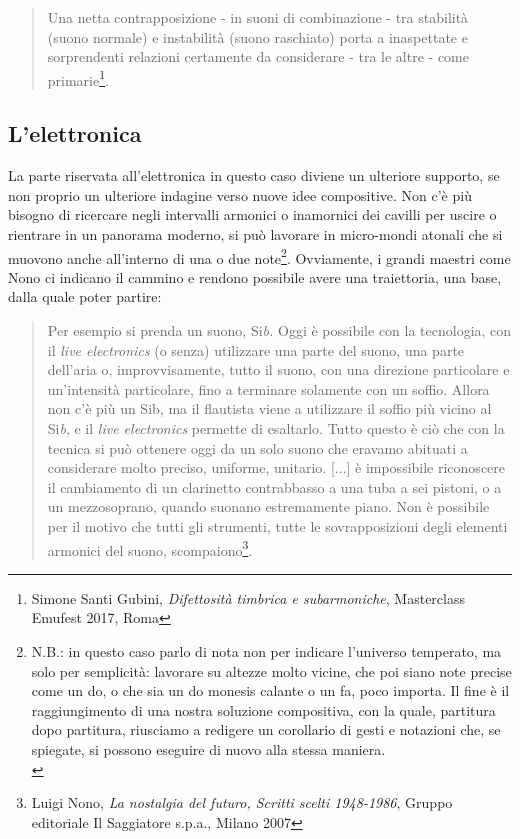 \begin{quotation}
Una netta contrapposizione - in suoni di combinazione - tra stabilità (suono normale) e instabilità (suono raschiato) porta a inaspettate e sorprendenti relazioni certamente da considerare - tra le altre - come primarie\footnote{Simone Santi Gubini, \textit{Difettosità timbrica e subarmoniche}, Masterclass Emufest  2017, Roma}.
\end{quotation}

\subsection{L'elettronica}

La parte riservata all’elettronica in questo caso diviene un ulteriore supporto, se non proprio un ulteriore indagine verso nuove idee compositive. Non c’è più bisogno di ricercare negli intervalli armonici o inamornici dei cavilli per uscire o rientrare in un panorama moderno, si può lavorare in micro-mondi atonali che si muovono anche all’interno di una o due note\footnote{N.B.: in questo caso parlo di nota non per indicare l'universo temperato, ma solo per semplicità: lavorare su altezze molto vicine, che poi siano note precise come un do, o che sia un do monesis calante o un fa, poco importa. Il fine è il raggiungimento di una nostra soluzione compositiva, con la quale, partitura dopo partitura, riusciamo a redigere un corollario di gesti e notazioni che, se spiegate, si possono eseguire di nuovo alla stessa maniera. \\}. Ovviamente, i grandi maestri come Nono ci indicano il cammino e rendono possibile avere una traiettoria, una base, dalla quale poter partire:

\begin{quotation}
Per esempio si prenda un suono, Si\textit{b.} Oggi è possibile con la tecnologia, con il \textit{live electronics} (o senza) utilizzare una parte del suono, una parte dell'aria o, improvvisamente, tutto il suono, con una direzione particolare e un'intensità particolare, fino a terminare solamente con un soffio. Allora non c'è più un Sib, ma il flautista viene a utilizzare il soffio più vicino al Si\textit{b}, e il \textit{live electronics} permette di esaltarlo. Tutto questo è ciò che con la tecnica si può ottenere oggi da un solo suono che eravamo abituati a considerare molto preciso, uniforme, unitario. [...]  è impossibile riconoscere il cambiamento di un clarinetto contrabbasso a una tuba a sei pistoni, o a un mezzosoprano, quando suonano estremamente piano. Non è possibile per il motivo che tutti gli strumenti, tutte le sovrapposizioni degli elementi armonici del suono, scompaiono\footnote{Luigi Nono, \textit{La nostalgia del futuro, Scritti scelti 1948-1986}, Gruppo editoriale Il Saggiatore s.p.a., Milano 2007}.
\end{quotation}

